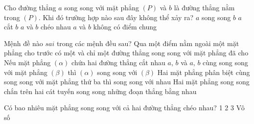 \begin{ex}%
	Cho đường thẳng $a$ song song với mặt phẳng $\left(P\right)$ và $b$ là đường thẳng nằm trong $\left(P\right)$. Khi đó trường  hợp nào sau đây không thể xảy ra?
	 \choice
		{$a$ song song $b$} 
		{\True $a$  cắt $b$}
		{$a$ và  $b$ chéo nhau}
		{$a$ và $b$  không có điểm chung}
\end{ex}

\begin{ex}%
	Mệnh đề nào $sai$ trong các  mệnh đều sau?
	\choice 
		{\True Qua một điểm nằm ngoài một mặt phẳng cho trước có một và chỉ một đường thẳng song song với mặt phẳng  đã cho}
		{Nếu mặt phẳng $\left(\alpha \right)$ chứa hai đường thẳng cắt nhau $a$, $b$ và $a$, $b$ cùng song song với mặt phẳng $\left(\beta \right)$ thì $\left(\alpha \right)$  song song với $\left(\beta \right)$}
		 {Hai mặt phẳng phân biệt cùng song song với mặt phẳng thứ ba thì song song với nhau}
		{Hai mặt phẳng  song song chắn trên hai cát tuyến song song những đoạn thẳng bằng nhau}
\end{ex}

\begin{ex}%
	 Có bao nhiêu mặt phẳng song song với cả hai đường thẳng chéo nhau?
	 \choice
		{1  }
		 {2 }
		{3 } 
		{\True  Vô số}
\end{ex}

